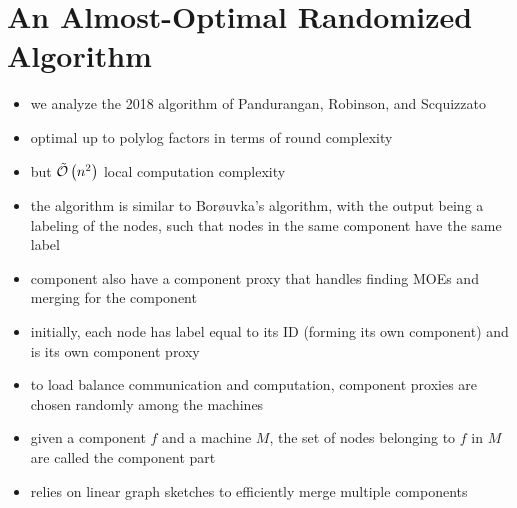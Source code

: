 \section{An Almost-Optimal Randomized Algorithm}
\begin{frame}
    \begin{itemize}
        \item we analyze the 2018 algorithm of Pandurangan, Robinson, and Scquizzato
        \item optimal up to polylog factors in terms of round complexity
        \item but $\tilde{\mathcal{O}}\left(n^2\right)$ local computation complexity
        \item the algorithm is similar to Bor\o{u}vka's algorithm, with
              the output being a \alert{labeling} of the nodes, such that nodes in the same component have the same label
        \item component also have a \alert{component proxy} that handles finding MOEs and merging for the component
        \item initially, each node has label equal to its ID (forming its own component) and is its own component proxy
        \item to load balance communication and computation, component proxies are chosen randomly among the machines
        \item given a component $f$ and a machine $M$, the set of nodes belonging
              to $f$ in $M$ are called the \alert{component part}
        \item relies on \alert{linear graph sketches} to efficiently merge multiple components
    \end{itemize}
\end{frame}

